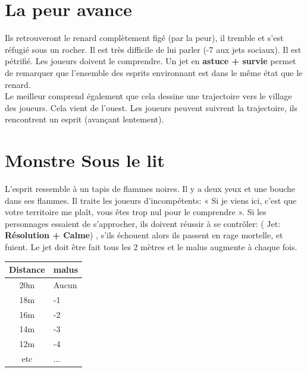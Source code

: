 \documentclass[oneside,12pt]{book}
\newcommand\roll[1]{
( Jet: \textbf{#1})
}
\begin{document}
\begin{flushleft}
\section{La peur avance}
Ils retrouveront le renard complètement figé (par la peur), il tremble et s'est réfugié sous un rocher. Il est très difficile de lui parler (-7 aux jets sociaux). Il est pétrifié. Les joueurs doivent le comprendre. Un jet en \textbf{astuce + survie} permet de remarquer que l’ensemble des esprits environnant est dans le même état que le renard.\\
Le meilleur comprend également que cela dessine une trajectoire vers le village des joueurs. Cela vient de l'ouest. Les joueurs peuvent suivrent la trajectoire, ils rencontrent un esprit (avançant lentement). 

\section{Monstre Sous le lit}
L'esprit ressemble à un tapis de flammes noires. Il y a deux yeux et une bouche dans ses flammes. Il traite les joueurs d'incompétents: « Si je viens ici, c'est que votre territoire me plaît, vous êtes trop nul pour le comprendre ».
Si les personnages essaient de s'approcher, ils doivent réussir à se contrôler:  \roll{Résolution + Calme}, s'ils échouent alors ils passent en rage mortelle, et fuient. 
Le jet doit être fait tous les 2 mètres et le malus augmente à chaque fois. \\

\begin{tabularx}{100}{|c|X|}
\hline
Distance & malus\\
\hline
20m & Aucun\\
\hline
18m & -1\\
\hline
16m & -2\\
\hline
14m & -3\\
\hline
12m & -4\\
\hline
etc & ...\\
\hline
\end{tabularx} \\


\end{flushleft}
\end{document}
